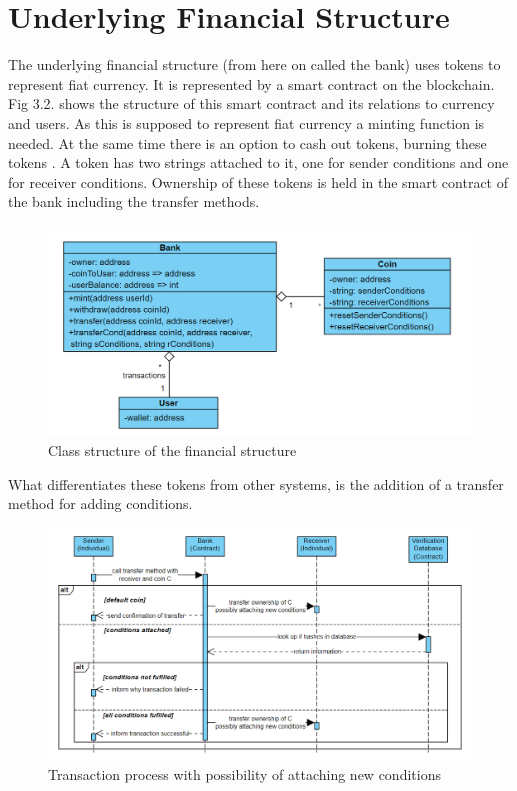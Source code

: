\section*{Underlying Financial Structure}
The underlying financial structure (from here on called the bank) uses tokens to represent fiat currency. It is represented by a smart contract on the blockchain. Fig 3.2. shows the structure of this smart contract and its relations to currency and users. As this is supposed to represent fiat currency a minting function is needed. At the same time there is an option to cash out tokens, burning these tokens \cite{pattern}. A token has two strings attached to it, one for sender conditions and one for receiver conditions. Ownership of these tokens is held in the smart contract of the bank including the transfer methods.\\
\begin{figure}[H]
    \centering
    \includegraphics[scale=0.45]{figures/financeUML.PNG}  
    \caption{Class structure of the financial structure}
    \label{fig:financeUML}
\end{figure}
What differentiates these tokens from other systems, is the addition of a transfer method for adding conditions.
\begin{figure}[H]
    \centering
    \includegraphics[scale=0.45]{figures/transfer.PNG}  
    \caption{Transaction process with possibility of attaching new conditions}
    \label{fig:transactionModel}
\end{figure}

